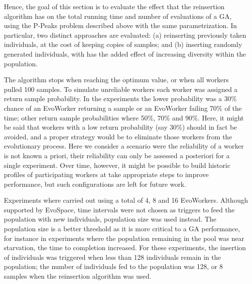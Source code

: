 Hence, the goal of this section is to evaluate the effect that the reinsertion algorithm has on the total
running time and number of evaluations of a GA, using the P-Peaks problem described above with the same parametrization.
In particular, two distinct approaches are evaluated: (a) reinserting previously taken individuals, at the cost of keeping copies of
samples; and (b) inserting randomly generated individuals, with has the added effect of increasing diversity within the population.

The algorithm stops when reaching the optimum value, or when all workers
pulled 100 samples. To simulate unreliable workers each worker was assigned a
return sample probability. In the experiments the lower probability was a 30\%
chance of an EvoWorker returning a sample or an EvoWorker failing 70\% of the
time; other return sample probabilities where 50\%, 70\% and 90\%.
Here, it might be said that workers with a low return probability (say 30\%) should in fact be avoided,
and a proper strategy would be to eliminate those workers from the evolutionary process.
Here we consider a scenario were the reliability of a worker is not known a priori, their reliability can only be assessed a posteriori for a single experiment.
Over time, however, it might be possible to build historic profiles of participating workers at take appropriate steps to improve performance,
but such configurations are left for future work.

Experiments where carried out using a total of 4, 8 and 16 EvoWorkers.
Although supported by EvoSpace, time intervals were not chosen as triggers
to feed the population with new individuals, population size was used instead.
The population size is a better threshold as it is more critical
to a GA performance, for instance in experiments where the population remaining in the pool was near starvation, the time to completion increased.
For these experiments, the insertion of individuals was triggered when less than
128 individuals remain in the population; the number of individuals fed to the
population was 128, or 8 samples when the reinsertion algorithm was used.


